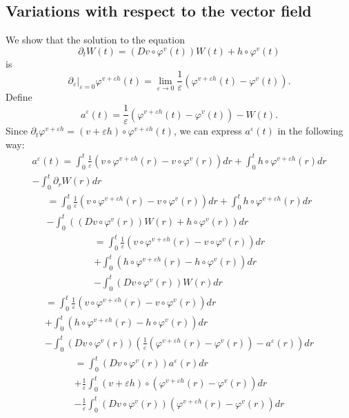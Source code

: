 \documentclass[a5paper,10pt,twoside]{article}
\theoremstyle{plain}
\theoremstyle{definition}
\theoremstyle{remark}
\begin{document}
\subsection{Variations with respect to the vector field}
We show that the solution to the equation
\[
\partial_t W(t)=\left(Dv\circ \varphi^v(t)\right)W(t)+h\circ \varphi^v(t)
\]
is
\[
\left.\partial_\varepsilon\right|_{\varepsilon=0}\varphi^{v+\varepsilon h}(t)=\lim_{\varepsilon\to 0}\frac{1}{\varepsilon}\left(\varphi^{v+\varepsilon h}(t)-\varphi^v(t)\right).
\]
Define
\[
a^\varepsilon(t)=\frac{1}{\varepsilon}\left(\varphi^{v+\varepsilon h}(t)-\varphi^v(t)\right)-W(t).
\]
Since $\partial_t\varphi^{v+\varepsilon h}=(v+\varepsilon h)\circ\varphi^{v+\varepsilon h}(t)$, we can express $a^\varepsilon(t)$ in the following way:
%
\begin{multline*}
a^\varepsilon(t)=\int_0^t \frac{1}{\varepsilon}\left(v\circ\varphi^{v+\varepsilon h}(r)-v\circ\varphi^v(r)\right)dr+\int_0^t h\circ \varphi^{v+\varepsilon h}(r)dr \\-\int_0^t\partial_rW(r)dr
\end{multline*}
\begin{multline*}
=\int_0^t \frac{1}{\varepsilon}\left(v\circ\varphi^{v+\varepsilon h}(r)-v\circ\varphi^v(r)\right)dr+\int_0^t h\circ \varphi^{v+\varepsilon h}(r)dr \\-\int_0^t\left(\left(Dv\circ \varphi^v(r)\right)W(r)+h\circ \varphi^v(r)\right)dr
\end{multline*}
\begin{multline*}
=\int_0^t \frac{1}{\varepsilon}\left(v\circ\varphi^{v+\varepsilon h}(r)-v\circ\varphi^v(r)\right)dr\\+\int_0^t \left(h\circ \varphi^{v+\varepsilon h}(r)-h\circ \varphi^v(r)\right)dr \\-\int_0^t\left(Dv\circ \varphi^v(r)\right)W(r)dr
\end{multline*}
\begin{multline*}
=\int_0^t \frac{1}{\varepsilon}\left(v\circ\varphi^{v+\varepsilon h}(r)-v\circ\varphi^v(r)\right)dr\\+\int_0^t \left(h\circ \varphi^{v+\varepsilon h}(r)-h\circ \varphi^v(r)\right)dr \\-\int_0^t\left(Dv\circ \varphi^v(r)\right)\left(\frac{1}{\varepsilon}\left(\varphi^{v+\varepsilon h}(r)-\varphi^v(r)\right)-a^\varepsilon(r)\right)dr
\end{multline*}
\begin{multline*}
=\int_0^t\left(Dv\circ \varphi^v(r)\right)a^\varepsilon(r)dr\\+\frac{1}{\varepsilon}\int_0^t (v+\varepsilon h)\circ\left(\varphi^{v+\varepsilon h}(r)-\varphi^v(r)\right)dr \\-\frac{1}{\varepsilon}\int_0^t\left(Dv\circ \varphi^v(r)\right)\left(\varphi^{v+\varepsilon h}(r)-\varphi^v(r)\right)dr
\end{multline*}
\end{document}

